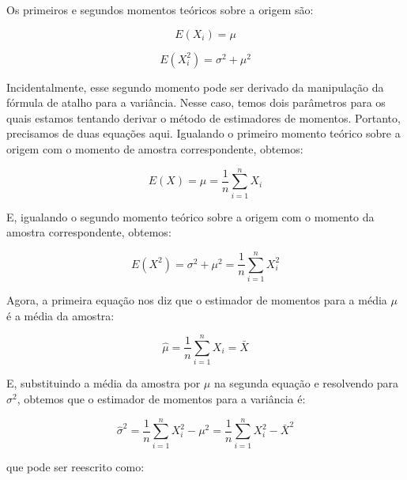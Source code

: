 Os primeiros e segundos momentos teóricos sobre a origem são:

\begin{equation}
	E(X_i) = \mu   
\end{equation}

\begin{equation}
	E(X_i^2) = \sigma^2 + \mu^2
\end{equation}

Incidentalmente, esse segundo momento pode ser derivado da manipulação da fórmula de atalho para a variância. Nesse caso, temos dois parâmetros para os quais estamos tentando derivar o método de estimadores de momentos. Portanto, precisamos de duas equações aqui. Igualando o primeiro momento teórico sobre a origem com o momento de amostra correspondente, obtemos:

\begin{equation}
	E(X)=\mu=\dfrac{1}{n}\sum\limits_{i=1}^n X_i
\end{equation}

E, igualando o segundo momento teórico sobre a origem com o momento da amostra correspondente, obtemos:

\begin{equation}
	E(X^2)=\sigma^2+\mu^2=\dfrac{1}{n}\sum\limits_{i=1}^n X_i^2
\end{equation}

Agora, a primeira equação nos diz que o estimador de momentos para a média \begin{math} \mu \end{math} é a média da amostra:

\begin{equation}
	\hat{\mu} = \dfrac{1}{n}\sum\limits_{i=1}^n X_i=\bar{X}
\end{equation}

E, substituindo a média da amostra por \begin{math} \mu \end{math}  na segunda equação e resolvendo para \begin{math} \sigma^2 \end{math}, obtemos que o estimador de momentos para a variância é:

\begin{equation}
	\hat{\sigma}^2=\dfrac{1}{n}\sum\limits_{i=1}^n X_i^2-\mu^2=\dfrac{1}{n}\sum\limits_{i=1}^n X_i^2-\bar{X}^2
\end{equation}

que pode ser reescrito como:

